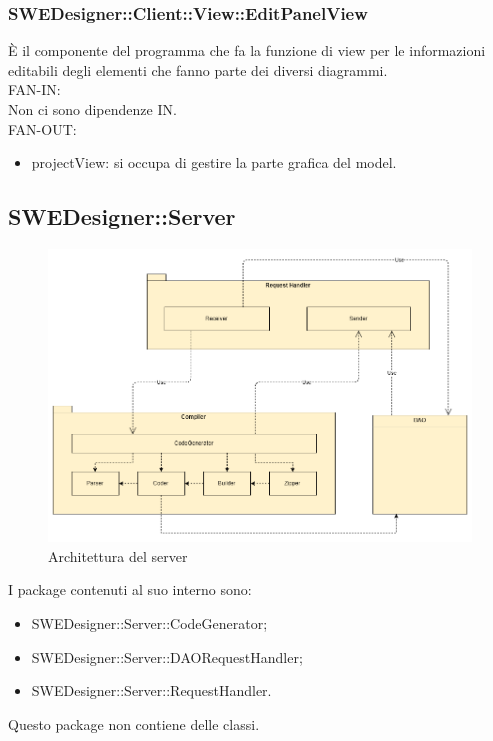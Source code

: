 \documentclass[../DefinizioneDiProdotto.tex]{subfiles}
\begin{document}
				\subsubsection{SWEDesigner::Client::View::EditPanelView}
				È il componente del programma che fa la funzione di view per le informazioni editabili degli elementi che fanno parte dei diversi diagrammi.\\
					FAN-IN:\\
					Non ci sono dipendenze IN. \\
					FAN-OUT:
					\begin{itemize}
						\item projectView: si occupa di gestire la parte grafica del model.
					\end{itemize}
			
			\subsection{SWEDesigner::Server}
				\begin{figure}[H]\label{fig:ServerSubsystem}
					\centering
					\includegraphics[scale=0.4]{Immagini/DiagrammaArchitettura/ServerSubsystem.png}
					\caption{Architettura del server}
				\end{figure}
				I package contenuti al suo interno sono:
				\begin{itemize}
					\item SWEDesigner::Server::CodeGenerator;
					\item SWEDesigner::Server::DAORequestHandler;
					\item SWEDesigner::Server::RequestHandler.
				\end{itemize}
				Questo package non contiene delle classi.
\end{document}
